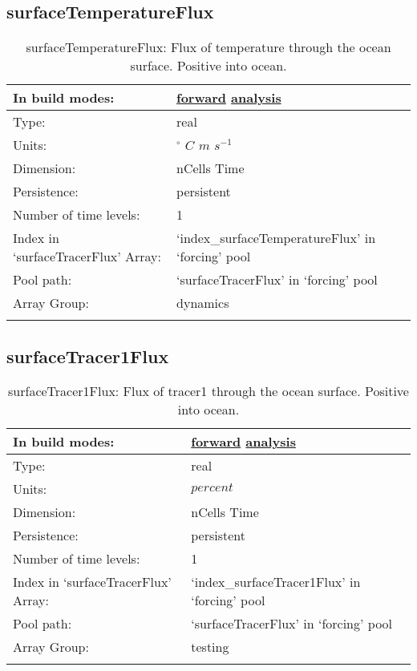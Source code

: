 \subsection[surfaceTemperatureFlux]{surfaceTemperatureFlux}
\label{subsec:var_sec_forcing_surfaceTemperatureFlux}
\begin{center}
\begin{longtable}{| p{2.0in} | p{4.0in} |}
        \hline 
        In build modes: & \hyperref[subsec:forward_var_tab_forcing]{forward} \hyperref[subsec:analysis_var_tab_forcing]{analysis} \\
        \hline 
        Type: & real \\
        \hline 
        Units: & $^\circ$ $C$ $m$ $s^{-1}$ \\
        \hline 
        Dimension: & nCells Time \\
        \hline 
        Persistence: & persistent \\
        \hline 
        Number of time levels: & 1 \\
        \hline 
		 Index in `surfaceTracerFlux' Array: & `index\_surfaceTemperatureFlux' in `forcing' pool \\
		 \hline 
            Pool path: & `surfaceTracerFlux' in `forcing' pool \\
		 \hline 
		 Array Group: & dynamics \\
		 \hline 
    \caption{surfaceTemperatureFlux: Flux of temperature through the ocean surface. Positive into ocean.}
\end{longtable}
\end{center}
\subsection[surfaceTracer1Flux]{surfaceTracer1Flux}
\label{subsec:var_sec_forcing_surfaceTracer1Flux}
\begin{center}
\begin{longtable}{| p{2.0in} | p{4.0in} |}
        \hline 
        In build modes: & \hyperref[subsec:forward_var_tab_forcing]{forward} \hyperref[subsec:analysis_var_tab_forcing]{analysis} \\
        \hline 
        Type: & real \\
        \hline 
        Units: & $percent$ \\
        \hline 
        Dimension: & nCells Time \\
        \hline 
        Persistence: & persistent \\
        \hline 
        Number of time levels: & 1 \\
        \hline 
		 Index in `surfaceTracerFlux' Array: & `index\_surfaceTracer1Flux' in `forcing' pool \\
		 \hline 
            Pool path: & `surfaceTracerFlux' in `forcing' pool \\
		 \hline 
		 Array Group: & testing \\
		 \hline 
    \caption{surfaceTracer1Flux: Flux of tracer1 through the ocean surface. Positive into ocean.}
\end{longtable}
\end{center}
